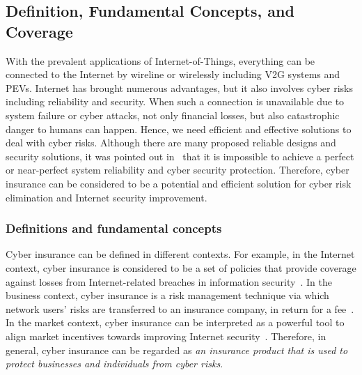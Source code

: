 \documentclass[twocolumn,10pt]{IEEEtran}
\begin{document}
\subsection{Definition, Fundamental Concepts, and Coverage}

With the prevalent applications of Internet-of-Things, everything can be connected to the Internet by wireline or wirelessly including V2G systems and PEVs. Internet has brought numerous advantages, but it also involves cyber risks including reliability and security. When such a connection is unavailable due to system failure or cyber attacks, not only financial losses, but also catastrophic danger to humans can happen. Hence, we need efficient and effective solutions to deal with cyber risks. Although there are many proposed reliable designs and security solutions, it was pointed out in~\cite{Pal2014Will} that it is impossible to achieve a perfect or near-perfect system reliability and cyber security protection. Therefore, cyber insurance can be considered to be a potential and efficient solution for cyber risk elimination and Internet security improvement. 


\subsubsection{Definitions and fundamental concepts}

Cyber insurance can be defined in different contexts. For example, in the Internet context, cyber insurance is considered to be a set of policies that provide coverage against losses from Internet-related breaches in information security~\cite{Gordon2003AFrame}. In the business context, cyber insurance is a risk management technique via which network users' risks are transferred to an insurance company, in return for a fee~\cite{Pal2014Will}. In the market context, cyber insurance can be interpreted as a powerful tool to align market incentives towards improving Internet security~\cite{Majuca2005_The}. Therefore, in general, cyber insurance can be regarded as \emph{an insurance product that is used to protect businesses and individuals from cyber risks}. 
\end{document}
